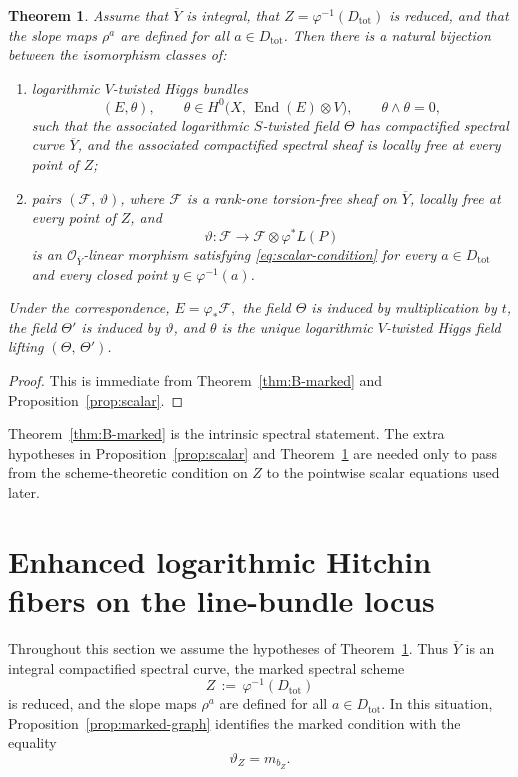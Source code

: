 \documentclass[a4paper,12pt]{amsart}
\numberwithin{equation}{section}
\newtheorem{theorem}{Theorem}[section]
\theoremstyle{definition}
\newcommand{\OO}{\mathcal{O}}
\newcommand{\cF}{\mathcal{F}}
\newcommand{\End}{\operatorname{End}}
\begin{document}
\begin{theorem}\label{thm:B}
Assume that \(\overline{Y}\) is integral, that \(Z=\varphi^{-1}(D_{\mathrm{tot}})\) is reduced, and that the slope maps \(\rho^a\) are defined for all \(a\in D_{\mathrm{tot}}\).  Then there is a natural bijection between the isomorphism classes of:
\begin{enumerate}
\item[(I)] logarithmic \(V\)-twisted Higgs bundles
\[
(E,\theta),
\qquad
\theta\in H^0\bigl(X,\, \End(E)\otimes V\bigr),
\qquad
\theta\wedge\theta=0,
\]
such that the associated logarithmic \(S\)-twisted field \(\Theta\) has compactified spectral curve \(\overline{Y}\), and the associated compactified spectral sheaf is locally free at every point of \(Z\);

\item[(II)] pairs \((\cF,\,\vartheta)\), where \(\cF\) is a rank-one torsion-free sheaf on \(\overline{Y}\), locally free at every point of \(Z\), and
\[
\vartheta:\cF\longrightarrow \cF\otimes \varphi^*L(P)
\]
is an \(\OO_{\overline{Y}}\)-linear morphism satisfying \eqref{eq:scalar-condition} for every \(a\in D_{\mathrm{tot}}\) and every closed point \(y\in \varphi^{-1}(a)\).
\end{enumerate}
Under the correspondence,
\(
E=\varphi_*\cF,
\)
the field \(\Theta\) is induced by multiplication by \(t\), the field \(\Theta'\) is induced by \(\vartheta\), and \(\theta\) is the unique logarithmic \(V\)-twisted Higgs field lifting \((\Theta,\,\Theta')\).
\end{theorem}
\begin{proof}
This is immediate from Theorem~\ref{thm:B-marked} and Proposition~\ref{prop:scalar}.
\end{proof}

Theorem~\ref{thm:B-marked} is the intrinsic spectral statement.  The extra hypotheses in Proposition~\ref{prop:scalar} and Theorem~\ref{thm:B} are needed only to pass from the scheme-theoretic condition on \(Z\) to the pointwise scalar equations used later.

\section{Enhanced logarithmic Hitchin fibers on the line-bundle locus}\label{sec:enhanced-hitchin}

Throughout this section we assume the hypotheses of Theorem~\ref{thm:B}.  Thus \(\overline{Y}\) is an integral compactified spectral curve, the marked spectral scheme
\[
Z\,:=\,\varphi^{-1}(D_{\mathrm{tot}})
\]
is reduced, and the slope maps \(\rho^a\) are defined for all \(a\in D_{\mathrm{tot}}\).  In this situation, Proposition~\ref{prop:marked-graph} identifies the marked condition with the equality
\begin{equation}\label{eq:section5-marked-condition}
\vartheta_Z=m_{b_Z}.
\end{equation}
\end{document}
